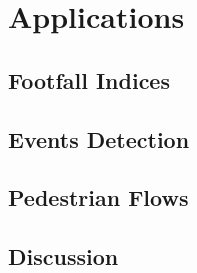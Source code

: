 \chapter{Applications}

\section{Footfall Indices}

\section{Events Detection}

\section{Pedestrian Flows}

\section{Discussion}
